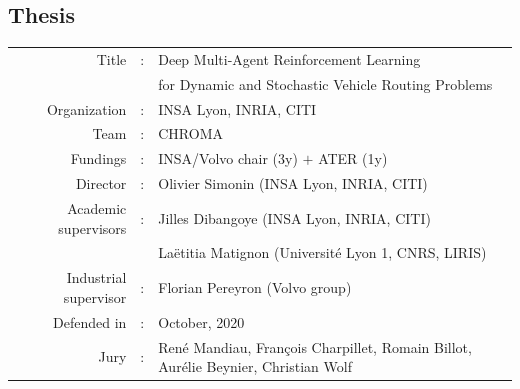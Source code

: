 \documentclass[a4paper,11pt]{article}
\begin{document}
\subsection*{Thesis}
\centering
\colorbox{orange!20}{\begin{tabular}{r c l}
	Title &: &Deep Multi-Agent Reinforcement Learning \\
	& &for Dynamic and Stochastic Vehicle Routing Problems \\
	Organization &: &INSA Lyon, INRIA, CITI \\
	Team &: &CHROMA \\
	Fundings &: &INSA/Volvo chair (3y) $+$ ATER (1y) \\
	Director &: &Olivier Simonin {\footnotesize (INSA Lyon, INRIA, CITI)} \\
	Academic supervisors &: &Jilles Dibangoye {\footnotesize (INSA Lyon, INRIA, CITI)} \\
	& &La{\"e}titia Matignon {\footnotesize (Universit{\'e} Lyon 1, CNRS, LIRIS)} \\
	Industrial supervisor &: &Florian Pereyron {\footnotesize (Volvo group)} \\
	Defended in &: &October, 2020 \\
	Jury &: &Ren{\'e} Mandiau, Fran{\c c}ois Charpillet, Romain Billot, Aur{\'e}lie Beynier, Christian Wolf
\end{tabular}}
\flushleft
\end{document}
